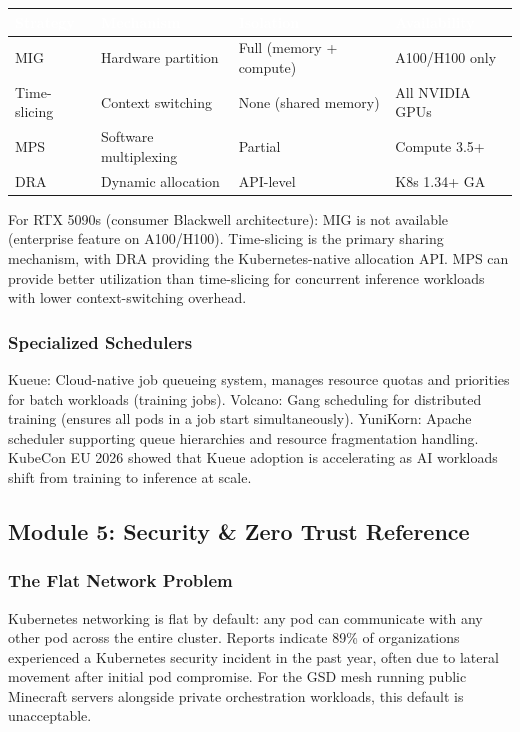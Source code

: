 \documentclass[11pt,letterpaper]{article}
\newcommand{\tableheader}[1]{\textbf{\sffamily\textcolor{white}{#1}}}
\begin{document}
\begin{center}
\begin{tabularx}{\textwidth}{L{2.5cm}XXC{2cm}}
\toprule
{}
\tableheader{Strategy} & \tableheader{Mechanism} & \tableheader{Isolation} & \tableheader{Availability} \\
\midrule
MIG & Hardware partition & Full (memory + compute) & A100/H100 only \\
Time-slicing & Context switching & None (shared memory) & All NVIDIA GPUs \\
MPS & Software multiplexing & Partial & Compute 3.5+ \\
DRA & Dynamic allocation & API-level & K8s 1.34+ GA \\
\bottomrule
\end{tabularx}
\end{center}

For RTX 5090s (consumer Blackwell architecture): MIG is not available (enterprise feature on A100/H100). Time-slicing is the primary sharing mechanism, with DRA providing the Kubernetes-native allocation API. MPS can provide better utilization than time-slicing for concurrent inference workloads with lower context-switching overhead.

\subsubsection{Specialized Schedulers}
Kueue: Cloud-native job queueing system, manages resource quotas and priorities for batch workloads (training jobs). Volcano: Gang scheduling for distributed training (ensures all pods in a job start simultaneously). YuniKorn: Apache scheduler supporting queue hierarchies and resource fragmentation handling. KubeCon EU 2026 showed that Kueue adoption is accelerating as AI workloads shift from training to inference at scale.

\subsection{Module 5: Security \& Zero Trust Reference}

\subsubsection{The Flat Network Problem}
Kubernetes networking is flat by default: any pod can communicate with any other pod across the entire cluster. Reports indicate 89\% of organizations experienced a Kubernetes security incident in the past year, often due to lateral movement after initial pod compromise. For the GSD mesh running public Minecraft servers alongside private orchestration workloads, this default is unacceptable.
\end{document}
